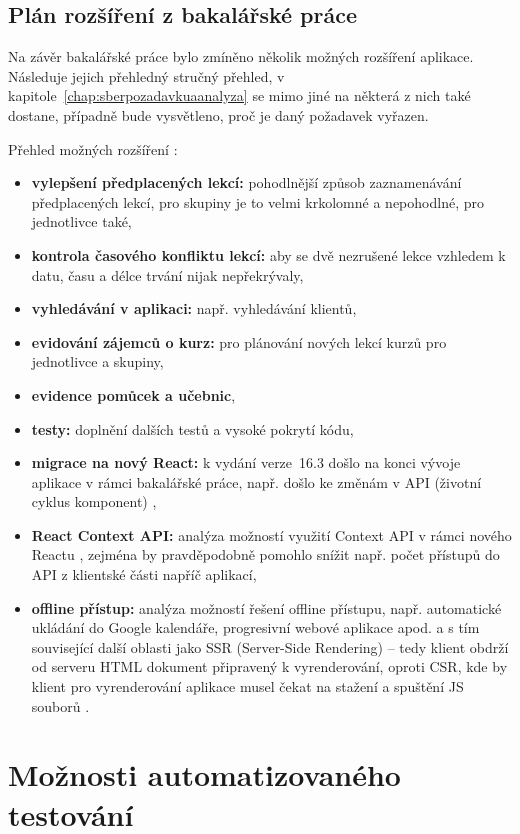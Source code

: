 \section{Plán rozšíření z bakalářské práce}\label{sec:planrozsirenibp}

Na závěr bakalářské práce \cite{bp} bylo zmíněno několik možných rozšíření aplikace. Následuje jejich přehledný stručný přehled, v kapitole~\ref{chap:sberpozadavkuaanalyza} se mimo jiné na některá z nich také dostane, případně bude vysvětleno, proč je daný požadavek vyřazen.

Přehled možných rozšíření \cite{bp}:
\begin{itemize}
    \item \textbf{vylepšení předplacených lekcí:} pohodlnější způsob zaznamenávání předplacených lekcí, pro skupiny je to velmi krkolomné a nepohodlné, pro jednotlivce také,
    \item \textbf{kontrola časového konfliktu lekcí:} aby se dvě nezrušené lekce vzhledem k datu, času a délce trvání nijak nepřekrývaly,
    \item \textbf{vyhledávání v aplikaci:} např. vyhledávání klientů,
    \item \textbf{evidování zájemců o kurz:} pro plánování nových lekcí kurzů pro jednotlivce a skupiny,
    \item \textbf{evidence pomůcek a učebnic},
    \item \textbf{testy:} doplnění dalších testů a vysoké pokrytí kódu,
    \item \textbf{migrace na nový React:} k vydání verze~16.3 došlo na konci vývoje aplikace v rámci bakalářské práce, např. došlo ke změnám v API (životní cyklus komponent) \cite{react-blog-163},
    \item \textbf{React Context API:} analýza možností využití Context API v rámci nového Reactu \cite{react-blog-163}, zejména by pravděpodobně pomohlo snížit např. počet přístupů do API z klientské části napříč aplikací,
    \item \textbf{offline přístup:} analýza možností řešení offline přístupu, např. automatické ukládání do Google kalendáře, progresivní webové aplikace apod. a s tím související další oblasti jako SSR (Server-Side Rendering) -- tedy klient obdrží od serveru HTML dokument připravený k vyrenderování, oproti CSR, kde by klient pro vyrenderování aplikace musel čekat na stažení a spuštění JS souborů \cite{csr-ssr}.
\end{itemize}

\chapter{Možnosti automatizovaného testování}

